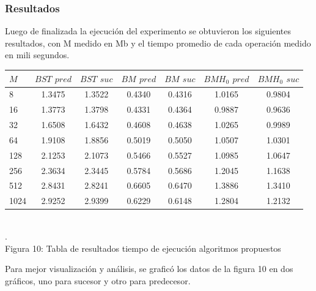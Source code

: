 \documentclass[11pt]{article}
\begin{document}
\subsubsection{Resultados}
Luego de finalizada la ejecución del experimento se obtuvieron los siguientes resultados, con M medido en Mb y el tiempo promedio de cada operación medido en mili segundos.
\begin{center}\begin{tabular}{|l|c|c|c|c|c|c|}
\hline
	$M$ & $BST$ $pred$ & $BST$ $suc$ & $BM$ $pred$ & $BM$ $suc$ & $BMH_{0}$ $pred$ & $BMH_{0}$ $suc$ \\
\hline
8	&   1.3475	&   1.3522	&   0.4340 &	   0.4316 &	   1.0165 &	   0.9804 \\
\hline
16	&   1.3773	&   1.3798	&   0.4331 &	   0.4364 &	   0.9887 &	   0.9636 \\
\hline
32	&   1.6508	&   1.6432	&   0.4608 &	   0.4638 &	   1.0265 &	   0.9989 \\
\hline
64	&   1.9108	&   1.8856	&   0.5019 &	   0.5050 &	   1.0507 &	   1.0301 \\
\hline
128	 &  2.1253	&   2.1073	&   0.5466 &	   0.5527 &	   1.0985 &	   1.0647 \\
\hline
256	 &  2.3634	&   2.3445	&   0.5784 &	   0.5686 &	   1.2045 &	   1.1638 \\
\hline
512	 &  2.8431	&   2.8241	&   0.6605 &	   0.6470 &	   1.3886 &	   1.3410 \\
\hline
1024 &	   2.9252	&   2.9399	&   0.6229 &	   0.6148 &	   1.2804 &	   1.2132 \\ 
\hline
\end{tabular}
\\\scriptsize{\color{white}.\color{black}\\Figura 10: Tabla de resultados tiempo de ejecución algoritmos propuestos}
\end{center}
Para mejor visualización y análisis, se graficó los datos de la figura 10 en dos gráficos, uno para sucesor y otro para predecesor.
\end{document}
